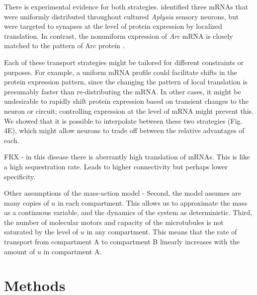 \documentclass[fleqn,10pt]{wlpeerj}
\begin{document}
There is experimental evidence for both strategies. \cite{Kim_2015} identified three mRNAs that were uniformly distributed throughout cultured \textit{Aplysia} sensory neurons, but were targeted to synapses at the level of protein expression by localized translation. In contrast, the nonuniform expression of \textit{Arc} mRNA is closely matched to the pattern of Arc protein \citep{Farris_2014, Steward_2015}. 

Each of these transport strategies might be tailored for different constraints or purposes. For example, a uniform mRNA profile could facilitate shifts in the protein expression pattern, since the changing the pattern of local translation is presumably faster than re-distributing the mRNA. In other cases, it might be undesirable to rapidly shift protein expression based on transient changes to the neuron or circuit; controlling expression at the level of mRNA might prevent this. We showed that it is possible to interpolate between these two strategies (Fig. 4E), which might allow neurons to trade off between the relative advantages of each.

FRX - in this disease there is aberrantly high translation of mRNAs. This is like a high sequestration rate. Leads to higher connectivity but perhaps lower specificity.

Other assumptions of the mass-action model - Second, the model assumes are many copies of $u$ in each compartment. This allows us to approximate the mass as a continuous variable, and the dynamics of the system as deterministic. Third, the number of molecular motors and capacity of the microtubules is not saturated by the level of $u$ in any compartment. This means that the rate of transport from compartment A to compartment B linearly increases with the amount of $u$ in compartment A.

\section*{Methods}
\end{document}
